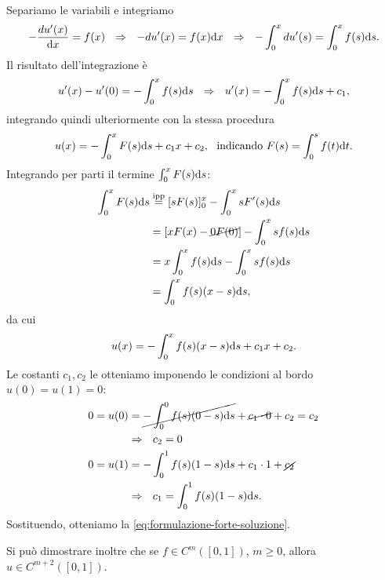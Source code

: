 Separiamo le variabili e integriamo
\begin{equation*}
-\frac{du'( x)}{\dx} =f( x) \ \ \Rightarrow \ \ -du'( x) =f( x) \dx\ \ \Rightarrow \ \ -\int ^{x}_{0} du'( s) =\int ^{x}_{0} f( s) \ds.
\end{equation*}
Il risultato dell'integrazione è
\begin{equation*}
u'( x) -u'( 0) =-\int ^{x}_{0} f( s) \ds\ \ \Rightarrow \ \ u'( x) =-\int ^{x}_{0} f( s) \ds+c_{1},
\end{equation*}
integrando quindi ulteriormente con la stessa procedura
\begin{equation*}
u( x) =-\int ^{x}_{0} F( s) \ds+c_{1} x+c_{2} ,\ \ \text{indicando} \ F( s) =\int ^{s}_{0} f( t) \dt.
\end{equation*}
Integrando per parti il termine $\int ^{x}_{0} F( s) \mathrm d s$:
\begin{align*}
\int ^{x}_{0} F( s) \mathrm d s & \overset{\text{ipp}}{=}[ sF( s)]^{x}_{0} -\int ^{x}_{0} sF'( s) \mathrm d s\\
 & =\left[ xF( x) -\cancel{0F( 0)}\right] -\int ^{x}_{0} sf( s) \mathrm d s\\
 & =x\int ^{x}_{0} f( s) \mathrm d s-\int ^{x}_{0} sf( s) \mathrm d s\\
 & =\int ^{x}_{0} f( s)( x-s) \mathrm d s,
\end{align*}
da cui
\begin{equation*}
u( x) =-\int ^{x}_{0} f( s)( x-s) \mathrm d s+c_{1} x+c_{2}.
\end{equation*}
Le costanti $c_{1} ,c_{2}$ le otteniamo imponendo le condizioni al bordo $u( 0) =u( 1) =0$:
\begin{align*}
0=u( 0) & =\cancel{-\int ^{0}_{0} f( s)( 0-s) \mathrm d s} +\cancel{c_{1} \cdot 0} +c_{2} =c_{2}\\
 & \Rightarrow \ \ c_{2} =0\\
0=u( 1) & =-\int ^{1}_{0} f( s)( 1-s) \mathrm d s+c_{1} \cdot 1+\cancel{c_{2}}\\
 & \Rightarrow \ \ c_{1} =\int ^{1}_{0} f( s)( 1-s) \mathrm d s.
\end{align*}
Sostituendo, otteniamo la \eqref{eq:formulazione-forte-soluzione}.\textqed

Si può dimostrare inoltre che se $f\in C^{m}([ 0,1])$, $m\geqslant 0$, allora $u\in C^{m+2}([ 0,1])$.

